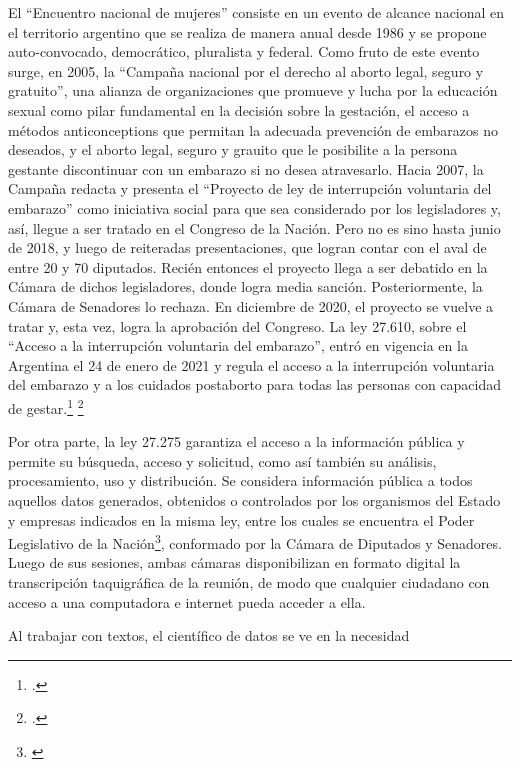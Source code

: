El ``Encuentro nacional de mujeres'' consiste en un evento de alcance nacional
en el territorio argentino que se realiza de manera anual desde 1986 y se propone
auto-convocado, democr\'atico, pluralista y federal.
Como fruto de este evento surge, en 2005, la ``Campaña nacional por el derecho al
aborto legal, seguro y gratuito'', una alianza de organizaciones que promueve y
lucha por la educaci\'on sexual como pilar fundamental en la decisi\'on sobre la gestaci\'on,
el acceso a m\'etodos anticonceptions que permitan la adecuada prevenci\'on de embarazos
no deseados, y el aborto legal, seguro y grauito que le posibilite a la persona gestante
discontinuar con un embarazo si no desea atravesarlo.
Hacia 2007, la Campaña redacta y presenta el ``Proyecto de ley de interrupci\'on
voluntaria del embarazo'' como iniciativa social para que sea considerado por los
legisladores y, as\'i, llegue a ser tratado en el Congreso de la Naci\'on.
Pero no es sino hasta junio de 2018, y luego de reiteradas presentaciones, que logran
contar con el aval de entre 20 y 70 diputados. Reci\'en entonces el proyecto llega a
ser debatido en la C\'amara de dichos legisladores, donde logra media sanci\'on.
Posteriormente, la C\'amara de Senadores lo rechaza.
En diciembre de 2020, el proyecto se vuelve a tratar y, esta vez, logra la aprobaci\'on
del Congreso.
La ley 27.610, sobre el ``Acceso a la interrupci\'on voluntaria del embarazo'', entr\'o
en vigencia en la Argentina el 24 de enero de 2021 y regula el acceso a la
interrupci\'on voluntaria del embarazo y a los cuidados postaborto para todas
las personas con capacidad de gestar.\footnote{\citeauthor{campana@lalucha}.}
\footnote{\citeauthor{huesped@historia}.}
\par
Por otra parte, la ley 27.275 garantiza el acceso a la informaci\'on p\'ublica y permite su b\'usqueda,
acceso y solicitud, como as\'i tambi\'en su an\'alisis, procesamiento, uso y distribuci\'on.
Se considera informaci\'on p\'ublica a todos aquellos datos generados, obtenidos o
controlados por los organismos del Estado y empresas indicados en la misma ley, entre
los cuales se encuentra el Poder Legislativo de la
Naci\'on\footnote{\citeauthor{minjusticia@accesoinfo}}, conformado por la C\'amara
de Diputados y Senadores.
Luego de sus sesiones, ambas c\'amaras disponibilizan en formato digital la
transcripci\'on taquigr\'afica de la reuni\'on, de modo que cualquier ciudadano con
acceso a una computadora e internet pueda acceder a ella.
\par
Al trabajar con textos, el cient\'ifico de datos se ve en la necesidad
